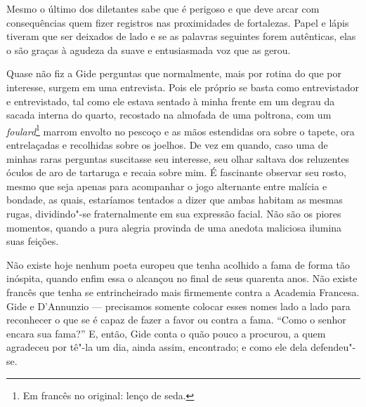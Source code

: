 Mesmo o último dos diletantes sabe que é perigoso e que deve arcar com consequências
quem fizer
registros nas proximidades de fortalezas. Papel e lápis tiveram que ser
deixados de lado e se as palavras seguintes forem autênticas, elas o são
graças à agudeza da suave e entusiasmada voz que as gerou.

Quase não fiz a Gide perguntas que normalmente, mais por rotina do que
por interesse, surgem em uma entrevista. Pois ele próprio se basta como entrevistador e entrevistado, tal como ele estava
sentado à minha frente em um degrau da sacada interna do quarto,
recostado na almofada de uma poltrona, com um \emph{foulard}\footnote{Em francês no original: lenço de seda. \versal{[N.~T.]}} marrom envolto no pescoço e as mãos estendidas ora
sobre o tapete, ora entrelaçadas e recolhidas sobre os joelhos.
De vez em
quando, caso uma de minhas raras perguntas suscitasse seu interesse, seu
olhar saltava dos reluzentes óculos de aro de tartaruga e recaia sobre
mim. É fascinante observar seu rosto, mesmo que seja apenas para
acompanhar o jogo alternante entre malícia e bondade, as quais,
estaríamos tentados a dizer que ambas habitam as mesmas rugas,
dividindo"-se fraternalmente em sua expressão facial. Não são os piores
momentos, quando a pura alegria provinda de uma anedota maliciosa
ilumina suas feições.

Não existe hoje nenhum poeta europeu que tenha acolhido a fama de forma
tão inóspita, quando enfim essa o alcançou no final de seus quarenta anos.
Não existe francês que tenha se entrincheirado mais firmemente contra a
Academia Francesa. Gide e D'Annunzio --- precisamos somente colocar esses
nomes lado a lado para reconhecer o que se é capaz de fazer a favor ou
contra a fama. ``Como o senhor encara sua fama?'' E, então, Gide conta o
quão pouco a procurou, a quem agradeceu por tê"-la um dia, ainda assim,
encontrado; e como ele dela defendeu"-se.

